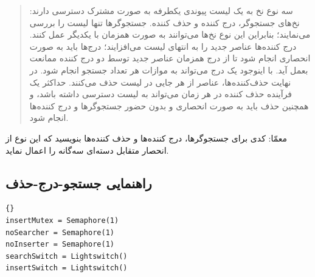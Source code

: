 \documentclass{book}
\newcommand{\clearemptydoublepage}{\newpage\cleardoublepage}
\begin{document}
\begin {quotation}
    سه نوع نخ به یک لیست پیوندی یکطرفه به صورت مشترک دسترسی دارند: 
    نخ‌های جستجوگر، درج‌ کننده‌ و حذف کننده.  جستجوگرها تنها لیست را بررسی می‌نمایند؛ بنابراین این نوع نخ‌ها می‌توانند به صورت همزمان با یکدیگر 
    عمل کنند. درج کننده‌ها عناصر جدید را به انتهای لیست می‌افزایند؛ درج‌ها باید به صورت انحصاری انجام شود تا  از درج همزمان عناصر جدید توسط 
    دو درج کننده ممانعت بعمل آید. با اینوجود یک درج می‌تواند به موازات هر تعداد جستجو انجام شود. 
    در نهایت حذف‌کننده‌ها، عناصر از هر جایی در لیست حذف می‌کنند. 
    حداکثر یک فرآینده حذف کننده در  هر زمان می‌تواند به لیست دسترسی داشته باشد، و همچنین حذف باید به صورت انحصاری 
    و بدون حضور جستجوگرها و درج کننده‌ها انجام شود. 
\end{quotation}

    معمّا: کدی برای جستجوگرها، درج کننده‌ها و حذف کننده‌ها بنویسید که این نوع از انحصار متقابل دسته‌ای سه‌گانه را اعمال نماید. 


\clearemptydoublepage
\subsection{راهنمایی جستجو-درج-حذف}

\begin{latin}
\begin{lstlisting}[title=\rl{راهنمایی جستجو-درج-حذف}]{}
insertMutex = Semaphore(1)
noSearcher = Semaphore(1)
noInserter = Semaphore(1)
searchSwitch = Lightswitch()    
insertSwitch = Lightswitch()
\end{lstlisting}
\end{latin}
\end{document}
